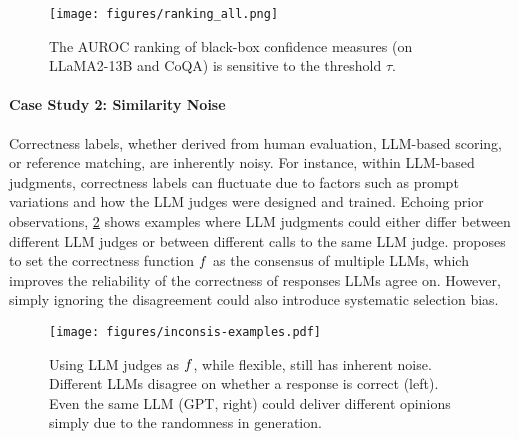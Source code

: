 \begin{figure}[t]
  \texttt{[image: figures/ranking\_all.png]}
  \caption{The AUROC ranking of black-box confidence measures (on LLaMA2-13B and CoQA) is sensitive to the threshold \( \tau \).
  }
  \label{fig:threshold}
\end{figure}

\paragraph{Case Study 2: Similarity Noise} 
Correctness labels, whether derived from human evaluation, LLM-based scoring, or reference matching, are inherently noisy. 
For instance, within LLM-based judgments, correctness labels can fluctuate due to factors such as prompt variations and how the LLM judges were designed and trained. 
Echoing prior observations, \cref{fig:inconsis} shows examples where LLM judgments could either differ between different LLM judges or between different calls to the same LLM judge.
\citet{CSL} proposes to set the correctness function $f$ as the consensus of multiple LLMs, which improves the reliability of the correctness of responses LLMs agree on.
However, simply ignoring the disagreement could also introduce systematic selection bias.


\begin{figure}[t]
  \texttt{[image: figures/inconsis-examples.pdf]}
  \caption{
  Using LLM judges as $f$, while flexible, still has inherent noise.
  Different LLMs disagree on whether a response is correct (left).
  Even the same LLM (GPT, right) could deliver different opinions simply due to the randomness in generation.
  }
  \label{fig:inconsis}
\end{figure}

